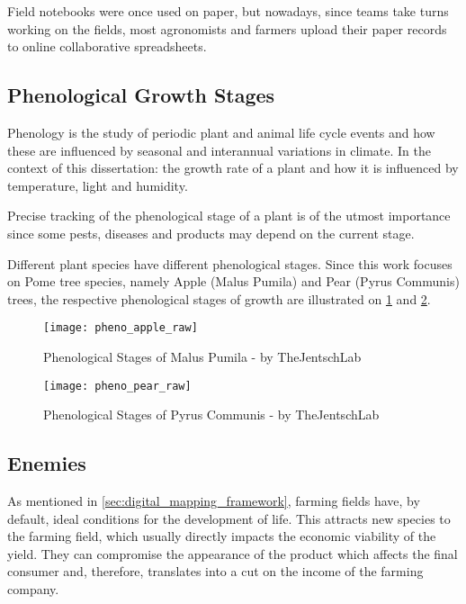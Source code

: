 Field notebooks were once used on paper, but nowadays, since teams take turns working on the fields, most agronomists and farmers upload their paper records to online collaborative spreadsheets. 

\subsection{Phenological Growth Stages}
\label{sec:problem_spreadsheets_phenological}

Phenology is the study of periodic plant and animal life cycle events and how these are influenced by seasonal and interannual variations in climate. In the context of this dissertation: the growth rate of a plant and how it is influenced by temperature, light and humidity. 

Precise tracking of the phenological stage of a plant is of the utmost importance since some pests, diseases and products may depend on the current stage.

Different plant species have different phenological stages. Since this work focuses on Pome tree species, namely Apple (Malus Pumila) and Pear (Pyrus Communis) trees, the respective phenological stages of growth are illustrated on \ref{fig:pheno_apple_raw} and \ref{fig:pheno_pear_raw}.

\begin{figure}[htbp]
  \centering
  \texttt{[image: pheno\_apple\_raw]}
  \caption{Phenological Stages of Malus Pumila - by TheJentschLab \cite{TheJentschLab}}
  \label{fig:pheno_apple_raw}
\end{figure}

\begin{figure}[htbp]
  \centering
  \texttt{[image: pheno\_pear\_raw]}
  \caption{Phenological Stages of Pyrus Communis - by TheJentschLab \cite{TheJentschLab}}
  \label{fig:pheno_pear_raw}
\end{figure}


\subsection{Enemies}
\label{sec:problem_spreadsheets_enemies}

As mentioned in \ref{sec:digital_mapping_framework}, farming fields have, by default, ideal conditions for the development of life. This attracts new species to the farming field, which usually directly impacts the economic viability of the yield. They can compromise the appearance of the product which affects the final consumer and, therefore, translates into a cut on the income of the farming company.

